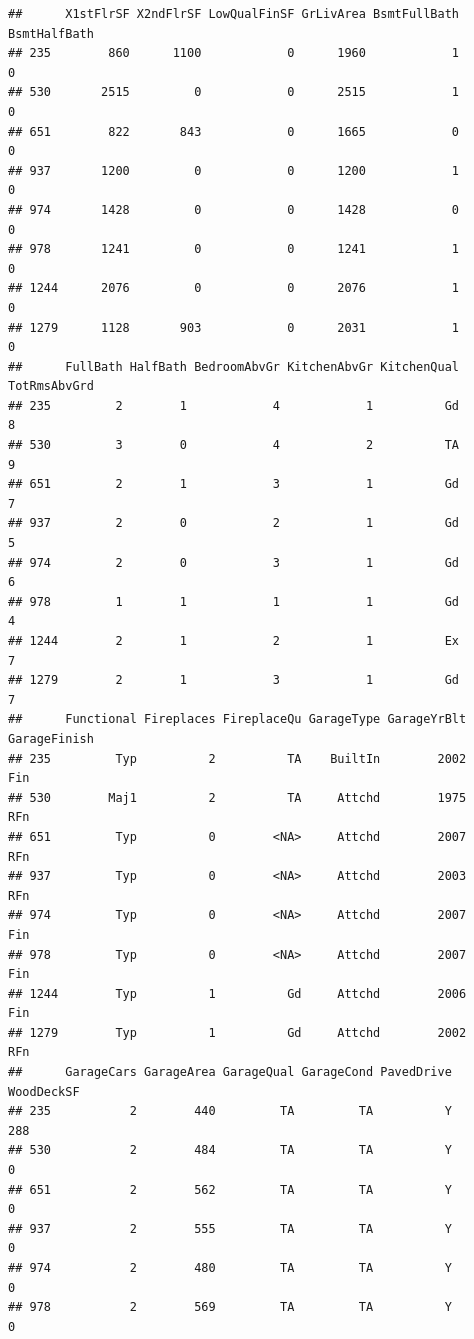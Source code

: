 \documentclass[]{article}
\begin{document}
\begin{verbatim}
##      X1stFlrSF X2ndFlrSF LowQualFinSF GrLivArea BsmtFullBath BsmtHalfBath
## 235        860      1100            0      1960            1            0
## 530       2515         0            0      2515            1            0
## 651        822       843            0      1665            0            0
## 937       1200         0            0      1200            1            0
## 974       1428         0            0      1428            0            0
## 978       1241         0            0      1241            1            0
## 1244      2076         0            0      2076            1            0
## 1279      1128       903            0      2031            1            0
##      FullBath HalfBath BedroomAbvGr KitchenAbvGr KitchenQual TotRmsAbvGrd
## 235         2        1            4            1          Gd            8
## 530         3        0            4            2          TA            9
## 651         2        1            3            1          Gd            7
## 937         2        0            2            1          Gd            5
## 974         2        0            3            1          Gd            6
## 978         1        1            1            1          Gd            4
## 1244        2        1            2            1          Ex            7
## 1279        2        1            3            1          Gd            7
##      Functional Fireplaces FireplaceQu GarageType GarageYrBlt GarageFinish
## 235         Typ          2          TA    BuiltIn        2002          Fin
## 530        Maj1          2          TA     Attchd        1975          RFn
## 651         Typ          0        <NA>     Attchd        2007          RFn
## 937         Typ          0        <NA>     Attchd        2003          RFn
## 974         Typ          0        <NA>     Attchd        2007          Fin
## 978         Typ          0        <NA>     Attchd        2007          Fin
## 1244        Typ          1          Gd     Attchd        2006          Fin
## 1279        Typ          1          Gd     Attchd        2002          RFn
##      GarageCars GarageArea GarageQual GarageCond PavedDrive WoodDeckSF
## 235           2        440         TA         TA          Y        288
## 530           2        484         TA         TA          Y          0
## 651           2        562         TA         TA          Y          0
## 937           2        555         TA         TA          Y          0
## 974           2        480         TA         TA          Y          0
## 978           2        569         TA         TA          Y          0

\end{verbatim}
\end{document}
